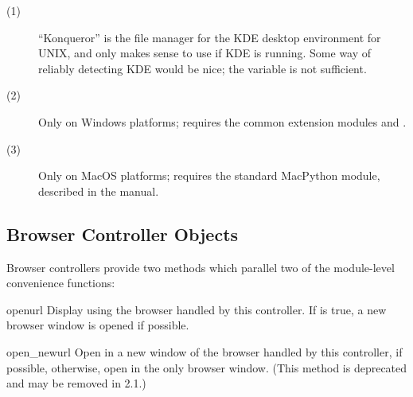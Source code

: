 \begin{description}
\item[(1)]
``Konqueror'' is the file manager for the KDE desktop environment for
UNIX, and only makes sense to use if KDE is running.  Some way of
reliably detecting KDE would be nice; the  variable is
not sufficient.

\item[(2)]
Only on Windows platforms; requires the common
extension modules  and .

\item[(3)]
Only on MacOS platforms; requires the standard MacPython 
module, described in the  manual.
\end{description}


\subsection{Browser Controller Objects \label{browser-controllers}}

Browser controllers provide two methods which parallel two of the
module-level convenience functions:

\begin{funcdesc}{open}{url}
  Display  using the browser handled by this controller.  If
   is true, a new browser window is opened if possible.
\end{funcdesc}

\begin{funcdesc}{open_new}{url}
  Open  in a new window of the browser handled by this
  controller, if possible, otherwise, open  in the only
  browser window.  (This method is deprecated and may be removed in
  2.1.)
\end{funcdesc}
